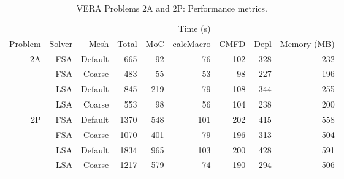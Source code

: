 {{{{        %

        \begin{table}[htbp]
          \caption{VERA Problems 2A and 2P: Performance metrics.\label{tab:LSMOC:LatticeDepletion:Performance}}
          \begin{tabular}{rrrrrrrrr}\toprule
                                &        &         & \multicolumn{5}{c}{Time (s)} & \\\cline{4-8}
            Problem             & Solver & Mesh    & Total & MoC & calcMacro & CMFD & Depl & Memory (MB)\\\midrule
            \multirow{4}{*}{2A} &    FSA & Default &  665 &  92 &  76 & 102 & 328 & 232\\
                                &    FSA & Coarse  &  483 &  55 &  53 &  98 & 227 & 196\\
                                &    LSA & Default &  845 & 219 &  79 & 108 & 344 & 255\\
                                &    LSA & Coarse  &  553 &  98 &  56 & 104 & 238 & 200\\\midrule
            \multirow{4}{*}{2P} &    FSA & Default & 1370 & 548 & 101 & 202 & 415 & 558\\
                                &    FSA & Coarse  & 1070 & 401 &  79 & 196 & 313 & 504\\
                                &    LSA & Default & 1834 & 965 & 103 & 200 & 428 & 591\\
                                &    LSA & Coarse  & 1217 & 579 &  74 & 190 & 294 & 506\\\bottomrule
          \end{tabular}
        \end{table}

}}}}
